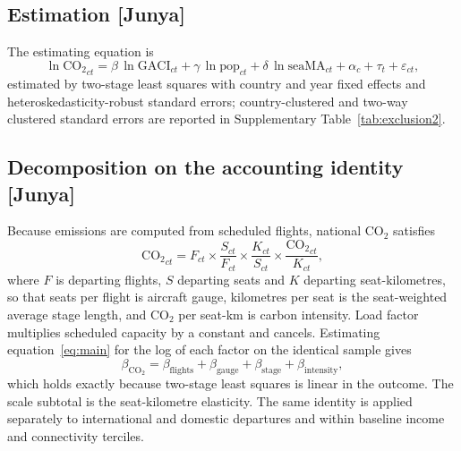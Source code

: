 \documentclass[12pt]{article}
\begin{document}
\subsection*{Estimation [Junya]}
The estimating equation is
\begin{equation}
\ln \mathrm{CO_2}_{ct} = \beta \,\ln \mathrm{GACI}_{ct}
 + \gamma \,\ln \mathrm{pop}_{ct} + \delta \,\ln \mathrm{seaMA}_{ct}
 + \alpha_c + \tau_t + \varepsilon_{ct},
\label{eq:main}
\end{equation}
estimated by two-stage least squares with country and year fixed effects
and heteroskedasticity-robust standard errors; country-clustered and
two-way clustered standard errors are reported in Supplementary
Table~\ref{tab:exclusion2}.

\subsection*{Decomposition on the accounting identity [Junya]}
Because emissions are computed from scheduled flights, national CO$_2$
satisfies
\begin{equation}
\mathrm{CO_2}_{ct} = F_{ct} \times \frac{S_{ct}}{F_{ct}} \times
\frac{K_{ct}}{S_{ct}} \times \frac{\mathrm{CO_2}_{ct}}{K_{ct}},
\label{eq:identity}
\end{equation}
where $F$ is departing flights, $S$ departing seats and $K$ departing
seat-kilometres, so that seats per flight is aircraft gauge, kilometres per
seat is the seat-weighted average stage length, and CO$_2$ per seat-km is
carbon intensity. Load factor multiplies scheduled capacity by a constant
and cancels. Estimating equation~\ref{eq:main} for the log of each factor
on the identical sample gives
\begin{equation}
\beta_{\mathrm{CO_2}} = \beta_{\mathrm{flights}} + \beta_{\mathrm{gauge}} +
\beta_{\mathrm{stage}} + \beta_{\mathrm{intensity}},
\label{eq:decomp}
\end{equation}
which holds exactly because two-stage least squares is linear in the
outcome. The scale subtotal is the seat-kilometre elasticity. The same
identity is applied separately to international and domestic departures
and within baseline income and connectivity terciles.
\end{document}
